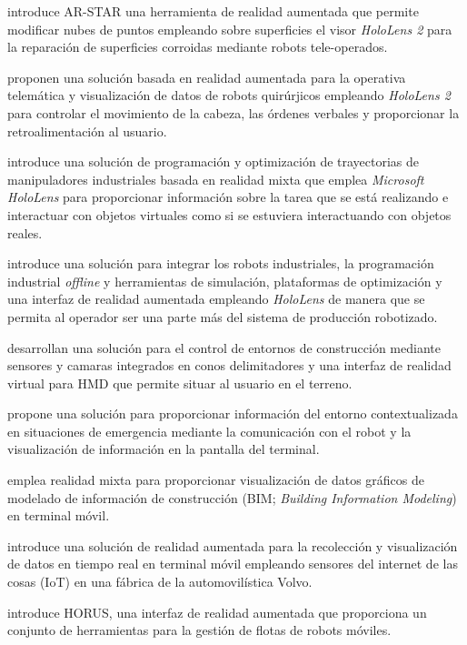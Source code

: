 \cite{10.1145/3610978.3640571} introduce AR-STAR 
una herramienta de realidad aumentada
que permite modificar nubes de puntos empleando sobre superficies
el visor \textit{HoloLens 2} para la reparación
de superficies corroidas mediante robots tele-operados.

\cite{alietal} proponen una solución basada en realidad aumentada para la 
operativa telemática y visualización de datos de robots quirúrjicos empleando
\textit{HoloLens 2} para controlar el movimiento de la cabeza, las 
órdenes verbales y proporcionar la retroalimentación al usuario.

\cite{nevesetal} introduce una solución de programación y optimización de trayectorias de manipuladores 
industriales basada en realidad mixta que emplea 
\textit{Microsoft HoloLens} para proporcionar 
información sobre la tarea que se está realizando e interactuar con 
objetos virtuales como si se estuviera interactuando con objetos reales.

\cite{inbook} introduce una solución para integrar los robots industriales,
la programación industrial \textit{offline} y herramientas 
de simulación, plataformas de optimización y una interfaz de realidad aumentada
empleando \textit{HoloLens} de manera que se permita al operador ser una parte
más del sistema de producción robotizado.

\cite{10770031} desarrollan una solución para el control de entornos de construcción
mediante sensores y camaras integrados en conos delimitadores y una interfaz 
de realidad virtual para HMD que permite situar al usuario en el terreno.

\cite{friske2024integrationaugmentedrealitymobile} propone una solución para proporcionar información del entorno contextualizada
en situaciones de emergencia mediante la comunicación con el robot y la visualización
de información en la pantalla del terminal.

\cite{10.22260/ISARC2019/0084} emplea realidad mixta para proporcionar visualización de 
datos gráficos de modelado de información de construcción
(BIM; \textit{Building Information Modeling}) en terminal móvil.

\cite{ROSALES2021618} introduce una solución de realidad aumentada para 
la recolección y visualización de datos en tiempo real 
en terminal móvil empleando sensores 
del internet de las cosas (IoT) en una fábrica de la automovilística Volvo.

\cite{adekoya2025horusmixedrealityinterface} introduce HORUS, una interfaz de realidad aumentada 
que proporciona un conjunto de herramientas para la gestión de flotas de robots móviles.

